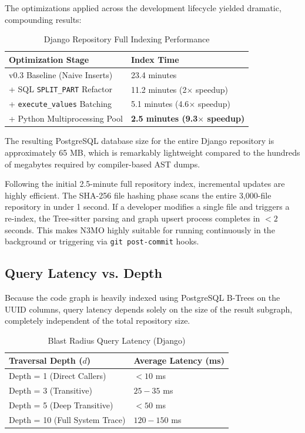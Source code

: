 \documentclass[conference]{IEEEtran}
\begin{document}
The optimizations applied across the development lifecycle yielded dramatic, compounding results:

\begin{table}[hbt!]
\centering
\caption{Django Repository Full Indexing Performance}
\begin{tabular}{@{}ll@{}}
\toprule
\textbf{Optimization Stage} & \textbf{Index Time} \\ \midrule
v0.3 Baseline (Naive Inserts) & 23.4 minutes \\
+ SQL \texttt{SPLIT\_PART} Refactor & 11.2 minutes (2$\times$ speedup) \\
+ \texttt{execute\_values} Batching & 5.1 minutes (4.6$\times$ speedup) \\
+ Python Multiprocessing Pool & \textbf{2.5 minutes (9.3$\times$ speedup)} \\ \bottomrule
\end{tabular}
\end{table}

The resulting PostgreSQL database size for the entire Django repository is approximately 65 MB, which is remarkably lightweight compared to the hundreds of megabytes required by compiler-based AST dumps. 

Following the initial 2.5-minute full repository index, incremental updates are highly efficient. The SHA-256 file hashing phase scans the entire 3,000-file repository in under 1 second. If a developer modifies a single file and triggers a re-index, the Tree-sitter parsing and graph upsert process completes in $< 2$ seconds. This makes N3MO highly suitable for running continuously in the background or triggering via \texttt{git post-commit} hooks.

\subsection{Query Latency vs. Depth}
Because the code graph is heavily indexed using PostgreSQL B-Trees on the UUID columns, query latency depends solely on the size of the result subgraph, completely independent of the total repository size. 

\begin{table}[hbt!]
\centering
\caption{Blast Radius Query Latency (Django)}
\begin{tabular}{@{}ll@{}}
\toprule
\textbf{Traversal Depth ($d$)} & \textbf{Average Latency (ms)} \\ \midrule
Depth = 1 (Direct Callers) & $< 10$ ms \\
Depth = 3 (Transitive) & $25 - 35$ ms \\
Depth = 5 (Deep Transitive) & $< 50$ ms \\
Depth = 10 (Full System Trace) & $120 - 150$ ms \\ \bottomrule
\end{tabular}
\end{table}
\end{document}
